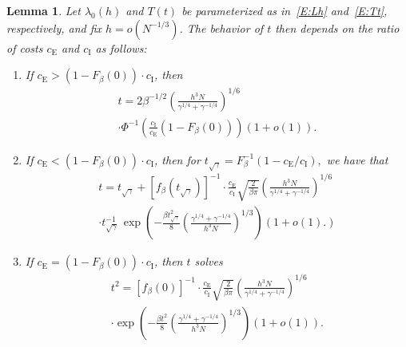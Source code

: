 \documentclass[final]{IEEEtran}
\newtheorem{lemma}{Lemma}
\newcommand{\ulambda}{\lambda_0}
\newcommand{\ce}{c_\text{E}}
\newcommand{\ci}{c_\text{I}}
\begin{document}
\begin{lemma}\label{L:thresh-small-h}
    Let  $\ulambda(h)$ and $T(t)$ be parameterized as in~\eqref{E:Lh} and~\eqref{E:Tt}, respectively, and fix $h = o\left(N^{-1/3}\right)$.  The behavior of $t$ then depends on the ratio of costs $\ce$ and $\ci$ as follows:
    \begin{enumerate}
    \item If $\ce > (1 -  F_\beta(0)) \cdot \ci$, then
    \begin{multline*}
        t
        =
        2
        \beta^{-1/2}
        \left(
            \frac{h^3 N}{ \gamma^{1/4} + \gamma^{-1/4} }
        \right)^{1/6}
        \\
        \cdot
        \Phi^{-1} \! \left(
            \frac{\ci}{\ce}
            \left(
                1 - F_\beta(0)
            \right)
        \right)
        \left(
            1 + o(1)
        \right).
    \end{multline*}
    \item If $\ce < (1 -  F_\beta(0)) \cdot \ci$, then for
    \(
        t_{\sqrt{\gamma}}
        =
        F_\beta^{-1} \!\left( 1 - \ce/\ci \right),
    \)
    we have that
    \begin{multline*}
        t
        =
        t_{\sqrt{\gamma}}
        +
        \left[
            f_\beta \left( t_{\sqrt{\gamma}} \right)
        \right]^{-1}
        \cdot
        \frac{\ce}{\ci}
        \sqrt{\frac{2}{\beta \pi}}
        \left(
            \frac{ h^3 N }{\gamma^{1/4} + \gamma^{-1/4}}
        \right)^{1/6}
        \\
        \cdot
        t_{\sqrt{\gamma}}^{-1} \,
        \exp\!\left(
            -
            \frac{\beta t_{\sqrt{\gamma}}^2}{8}
            \left(
                \frac{\gamma^{1/4} + \gamma^{-1/4}}{ h^3 N }
            \right)^{1/3}
        \right)
        \left(
            1 + o(1).
        \right)
    \end{multline*}
    \item If $\ce = (1 -  F_\beta(0)) \cdot \ci$, then $t$ solves
    \begin{multline*}
        t^2
        =
        \left[
               f_\beta ( 0 )
        \right]^{-1}
        \cdot
        \frac{\ce}{\ci}
        \sqrt{\frac{2}{\beta \pi}}
        \left(
            \frac{ h^3 N }{\gamma^{1/4} + \gamma^{-1/4}}
        \right)^{1/6}
        \\
        \cdot
        \exp \!\left(
            -
            \frac{\beta t^2}{8}
            \left(
                \frac{\gamma^{1/4} + \gamma^{-1/4}}{ h^3 N }
            \right)^{1/3}
        \right)
        \left(
            1 + o\left( 1 \right)
        \right).
    \end{multline*}
    \end{enumerate}
\end{lemma}
\end{document}
